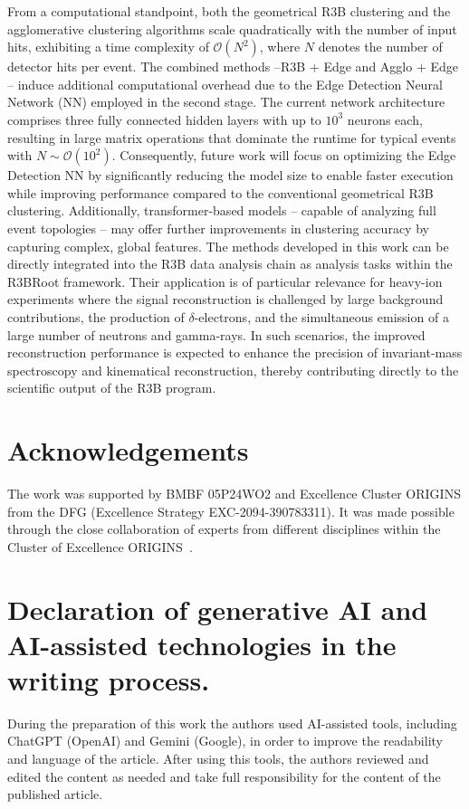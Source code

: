 \documentclass[review,sort&compress]{elsarticle}
\begin{document}
From a computational standpoint, both the geometrical R3B clustering and the agglomerative clustering algorithms scale quadratically with the number of input hits, exhibiting a time complexity of \(\mathcal{O}(N^2)\), where \(N\) denotes the number of detector hits per event. The combined methods --R3B + Edge and Agglo + Edge -- induce additional computational overhead due to the Edge Detection Neural Network (NN) employed in the second stage. The current network architecture comprises three fully connected hidden layers with up to \(10^3\) neurons each, resulting in large matrix operations that dominate the runtime for typical events with \(N \sim \mathcal{O}(10^2)\). Consequently, future work will focus on optimizing the Edge Detection NN by significantly reducing the model size to enable faster execution while improving performance compared to the conventional geometrical R3B clustering.\newline
Additionally, transformer-based models \cite{vaswani2017attention} -- capable of analyzing full event topologies -- may offer further improvements in clustering accuracy by capturing complex, global features.\newline
The methods developed in this work can be directly integrated into the R3B data analysis chain as analysis tasks within the R3BRoot framework. Their application is of particular relevance for heavy-ion experiments where the signal reconstruction is challenged by large background contributions, the production of $\delta$-electrons, and the simultaneous emission of a large number of neutrons and gamma-rays. In such scenarios, the improved reconstruction performance is expected to enhance the precision of invariant-mass spectroscopy and kinematical reconstruction, thereby contributing directly to the scientific output of the R3B program.

\section*{Acknowledgements}
The work was supported by BMBF 05P24WO2 and Excellence Cluster ORIGINS from the DFG (Excellence Strategy EXC-2094-390783311). It was made possible through the close collaboration of experts from different disciplines within the Cluster of Excellence ORIGINS~\cite{origins2025}.

\section*{Declaration of generative AI and AI-assisted technologies in the writing process.}
During the preparation of this work the authors used AI-assisted tools, including ChatGPT (OpenAI) and Gemini (Google), in order to improve the readability and language of the article. After using this tools, the authors reviewed and edited the content as needed and take full responsibility for the content of the published article.
\clearpage
\end{document}
